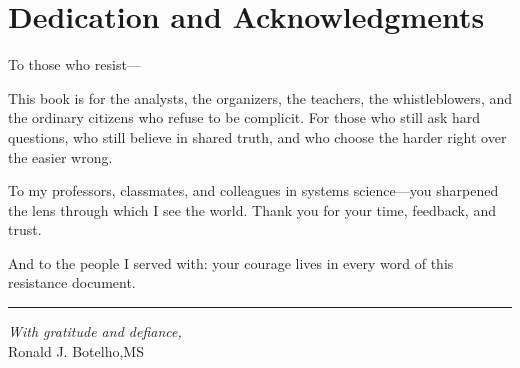 \chapter*{Dedication and Acknowledgments}
\vspace{1em}

To those who resist—

This book is for the analysts, the organizers, the teachers, the whistleblowers, and the ordinary citizens who refuse to be complicit. For those who still ask hard questions, who still believe in shared truth, and who choose the harder right over the easier wrong.

To my professors, classmates, and colleagues in systems science—you sharpened the lens through which I see the world. Thank you for your time, feedback, and trust.

And to the people I served with: your courage lives in every word of this resistance document.

\vspace{1em}
\hrule
\vspace{1em}

\emph{With gratitude and defiance,}\\
Ronald J. Botelho,MS

